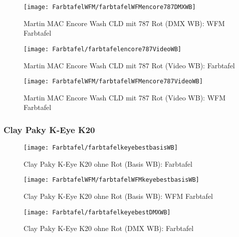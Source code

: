 \documentclass[pagesize,paper=A4,fontsize=12pt,utf8,numbers=noenddot,bibliography=totoc,listof=totoc,DIV=11,BCOR=1mm]{scrreprt}
\begin{document}
\begin{figure}[htp]     %
\centering
\texttt{[image: FarbtafelWFM/farbtafelWFMencore787DMXWB]} 
\caption {Martin MAC Encore Wash CLD mit 787 Rot (DMX WB): WFM Farbtafel} 
\end{figure}

\begin{figure}[htp]     %
\centering
\texttt{[image: Farbtafel/farbtafelencore787VideoWB]} 
\caption {Martin MAC Encore Wash CLD mit 787 Rot (Video WB): Farbtafel} 
\end{figure}

\begin{figure}[htp]     %
\centering
\texttt{[image: FarbtafelWFM/farbtafelWFMencore787VideoWB]} 
\caption {Martin MAC Encore Wash CLD mit 787 Rot (Video WB): WFM Farbtafel} 
\end{figure}



\subsubsection{Clay Paky K-Eye K20}

\begin{figure}[htp]     %
\centering
\texttt{[image: Farbtafel/farbtafelkeyebestbasisWB]} 
\caption {Clay Paky K-Eye K20 ohne Rot (Basis WB): Farbtafel} 
\end{figure}

\begin{figure}[htp]     %
\centering
\texttt{[image: FarbtafelWFM/farbtafelWFMkeyebestbasisWB]} 
\caption {Clay Paky K-Eye K20 ohne Rot (Basis WB): WFM Farbtafel} 
\end{figure}

\begin{figure}[htp]     %
\centering
\texttt{[image: Farbtafel/farbtafelkeyebestDMXWB]} 
\caption {Clay Paky K-Eye K20 ohne Rot (DMX WB): Farbtafel} 
\end{figure}
\end{document}
